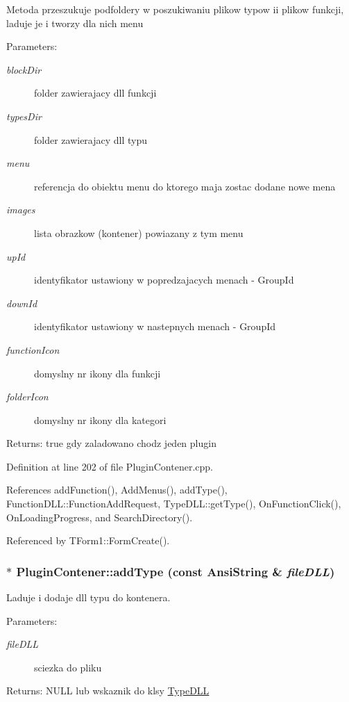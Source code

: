 Metoda przeszukuje podfoldery w poszukiwaniu plikow typow ii plikow funkcji, laduje je i tworzy dla nich menu \begin{Desc}
\item[Parameters:]
\begin{description}
\item[{\em blockDir}]folder zawierajacy dll funkcji \item[{\em typesDir}]folder zawierajacy dll typu \item[{\em menu}]referencja do obiektu menu do ktorego maja zostac dodane nowe mena \item[{\em images}]lista obrazkow (kontener) powiazany z tym menu \item[{\em upId}]identyfikator ustawiony w popredzajacych menach - GroupId \item[{\em downId}]identyfikator ustawiony w nastepnych menach - GroupId \item[{\em functionIcon}]domyslny nr ikony dla funkcji \item[{\em folderIcon}]domyslny nr ikony dla kategori \end{description}
\end{Desc}
\begin{Desc}
\item[Returns:]true gdy zaladowano chodz jeden plugin \end{Desc}


Definition at line 202 of file PluginContener.cpp.

References addFunction(), AddMenus(), addType(), FunctionDLL::FunctionAddRequest, TypeDLL::getType(), OnFunctionClick(), OnLoadingProgress, and SearchDirectory().

Referenced by TForm1::FormCreate().\hypertarget{classPluginContener_8cb31600aba8d95004d182187a2ed42b}{
\subsubsection[addType]{ $\ast$ PluginContener::addType (const AnsiString \& {\em fileDLL})}}
\label{classPluginContener_8cb31600aba8d95004d182187a2ed42b}


Laduje i dodaje dll typu do kontenera. \begin{Desc}
\item[Parameters:]
\begin{description}
\item[{\em fileDLL}]sciezka do pliku \end{description}
\end{Desc}
\begin{Desc}
\item[Returns:]NULL lub wskaznik do klsy \hyperlink{classTypeDLL}{TypeDLL} \end{Desc}


